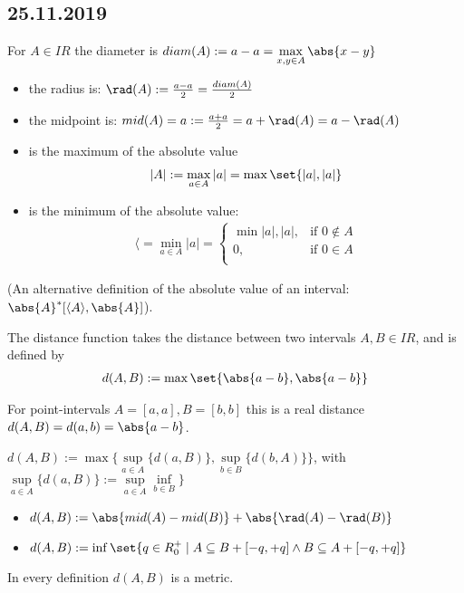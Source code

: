 \subsection*{25.11.2019}
\begin{*definition}
	For $A\in IR$ the diameter is $diam(A):=a-a=\max\limits_{x,y\in A}\abs{x-y}$
	\begin{itemize}
		\item the radius is: $\rad(A):=\frac{a-a}{2}=\frac{diam(A)}{2}$
		\item the midpoint is: $mid(A)=a:=\frac{a+a}{2}=a+\rad(A)=a-\rad(A)$
		\item  is the maximum of the absolute value 
		\begin{align*}
			|A|:=\max\limits_{a\in A}|a|=\max\set{|a|,|a|}
		\end{align*}
		\item is the minimum of the absolute value:
		\begin{align*}
			\langle=\min\limits_{a\in A}|a|=
			\begin{cases}
			\min{|a|,|a|}, & \text{if } 0\not \in A\\
			0, & \text{if } 0\in A \\
			\end{cases}
		\end{align*}
	\end{itemize}
(An alternative definition of the absolute value of an interval: $\abs{A}^{\ast} [\langle A \rangle,\abs{A}]$).
\end{*definition}
\begin{*definition}
	The distance function takes the distance between two intervals $A,B\in IR$, and is defined by
	\begin{align*}
		d(A,B):=\max\set{\abs{a-b},\abs{a-b}}
	\end{align*}
\end{*definition}
\begin{*remark}
	For point-intervals $A=[a,a], B=[b,b]$ this is a real distance $d(A,B)=d(a,b)=\abs{a-b}$.
\end{*remark}
\begin{*definition}
	$d(A,B):=\max\{\sup\limits_{a\in A}\{d(a,B)\}, \sup\limits_{b\in B}\{d(b,A)\}\}$, with $\sup\limits_{a\in A}\{d(a,B)\}:=\sup\limits_{a\in A}\inf\limits_{b\in B}\}$
\end{*definition}
\begin{definition}
	\begin{itemize}
		\item $d(A,B):=\abs{mid(A)-mid(B)}+\abs{\rad(A)-\rad(B)}$
		\item $d(A,B):=\inf\set{q\in R_0^+\mid A\subseteq B+[-q,+q] \land B\subseteq A+[-q,+q]}$
\end{itemize}
	In every definition $d(A,B)$ is a metric.
\end{definition}
